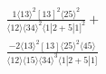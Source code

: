 \documentclass[varwidth, border=5pt]{standalone}
\begin{document}
\begin{my}
$\begin{gathered}
\scriptscriptstyle\frac{1⟨13⟩^2[13]^2⟨25⟩^2}{⟨12⟩⟨34⟩^2⟨1|2+5|1]^2}+\\
\scriptscriptstyle\frac{-2⟨13⟩^2[13]⟨25⟩^2⟨45⟩}{⟨12⟩⟨15⟩⟨34⟩^3⟨1|2+5|1]}\phantom{+}
\end{gathered}$
\end{my}
\end{document}
